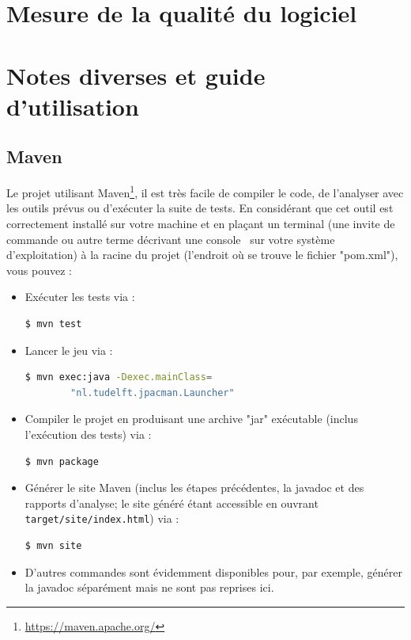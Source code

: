 \documentclass[12pt, openany]{report}
\begin{document}
\section{Mesure de la qualité du logiciel} 
\section{Notes diverses et guide d'utilisation}
\subsection{Maven}
Le projet utilisant Maven\footnote{\url{https://maven.apache.org/}}, il est très facile de compiler le code, de l'analyser avec les outils prévus ou d'exécuter la suite de tests.
En considérant que cet outil est correctement installé sur votre machine et en plaçant un terminal (une invite de commande ou autre terme décrivant une \og console \fg \, sur votre système d'exploitation) à la racine du projet (l'endroit où se trouve le fichier "pom.xml"), vous pouvez :
\begin{itemize}
	\item Exécuter les tests via :
	\begin{lstlisting}[language=bash]
	$ mvn test
	\end{lstlisting}
	\item Lancer le jeu via :
	\begin{lstlisting}[language=bash]
	$ mvn exec:java -Dexec.mainClass=
		"nl.tudelft.jpacman.Launcher"
	\end{lstlisting}
	\item Compiler le projet en produisant une archive "jar" exécutable (inclus l'exécution des tests) via : %
	\begin{lstlisting}[language=bash]
	$ mvn package
	\end{lstlisting}
	\item Générer le site Maven (inclus les étapes précédentes, la javadoc et des rapports d'analyse; le site généré étant accessible en ouvrant \nolinkurl{target/site/index.html}) via :
	\begin{lstlisting}[language=bash]
	$ mvn site
	\end{lstlisting}
	\item D'autres commandes sont évidemment disponibles pour, par exemple, générer la javadoc séparément mais ne sont pas reprises ici.
\end{itemize}
\end{document}
